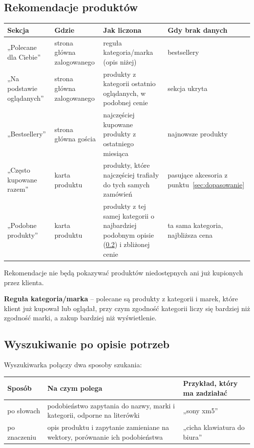 \documentclass[11pt,a4paper]{article}
\begin{document}
\subsection{Rekomendacje produktów}\label{sec:rekomendacje}

{\footnotesize
\begin{tabularx}{\textwidth}{P{2.7cm}P{2.6cm}LP{3.6cm}}
\toprule
\textbf{Sekcja} & \textbf{Gdzie} & \textbf{Jak liczona} & \textbf{Gdy brak danych} \\
\midrule
„Polecane dla Ciebie” & strona główna zalogowanego & reguła kategoria/marka (opis niżej) & bestsellery \\
„Na podstawie oglądanych” & strona główna zalogowanego & produkty z kategorii ostatnio oglądanych,
w podobnej cenie & sekcja ukryta \\
„Bestsellery” & strona główna gościa & najczęściej kupowane produkty z ostatniego miesiąca & najnowsze
produkty \\
„Często kupowane razem” & karta produktu & produkty, które najczęściej trafiały do tych samych zamówień &
pasujące akcesoria z punktu~\ref{sec:dopasowanie} \\
„Podobne produkty” & karta produktu & produkty z tej samej kategorii o najbardziej podobnym opisie
(\ref{sec:wyszukiwanie}) i zbliżonej cenie & ta sama kategoria, najbliższa cena \\
\bottomrule
\end{tabularx}\par\medskip
}

Rekomendacje nie będą pokazywać produktów niedostępnych ani już kupionych przez klienta.

\textbf{Reguła kategoria/marka} -- polecane są produkty z kategorii i marek, które klient już kupował lub
oglądał, przy czym zgodność kategorii liczy się bardziej niż zgodność marki, a zakup bardziej niż
wyświetlenie.

\subsection{Wyszukiwanie po opisie potrzeb}\label{sec:wyszukiwanie}

Wyszukiwarka połączy dwa sposoby szukania:

{\small
\begin{tabularx}{\textwidth}{P{2.4cm}LP{4.2cm}}
\toprule
\textbf{Sposób} & \textbf{Na czym polega} & \textbf{Przykład, który ma zadziałać} \\
\midrule
po słowach & podobieństwo zapytania do nazwy, marki i kategorii, odporne na literówki & „sony xm5” \\
po znaczeniu & opis produktu i zapytanie zamieniane na wektory, porównanie ich podobieństwa & „cicha
klawiatura do biura” \\
\bottomrule
\end{tabularx}\par\medskip
}
\end{document}
